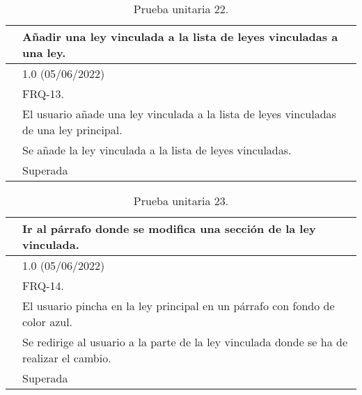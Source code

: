 \begin{table}[H]
\begin{center}
\begin{tabular}{|p{3cm}|p{10cm}|} \hline
\centering {\bf PU-22} & Añadir una ley vinculada a la lista de leyes vinculadas a una ley.  \\ \hline\hline
\centering {\bf Versión} & 1.0 (05/06/2022) \\ \hline
\centering {\bf Dependencias} & FRQ-13. \\ \hline
\centering {\bf Descripción} &  El usuario añade una ley vinculada a la lista de leyes vinculadas de una ley principal. \\ \hline
\centering {\bf Criterio de aceptación} & Se añade la ley vinculada a la lista de leyes vinculadas. \\ \hline
\centering {\bf Estado} & Superada \\ \hline
\end{tabular}
\caption{Prueba unitaria 22.}
\label{enlacePU22}
\end{center}
\end{table}

\begin{table}[H]
\begin{center}
\begin{tabular}{|p{3cm}|p{10cm}|} \hline
\centering {\bf PU-23} & Ir al párrafo donde se modifica una sección de la ley vinculada.  \\ \hline\hline
\centering {\bf Versión} & 1.0 (05/06/2022) \\ \hline
\centering {\bf Dependencias} & FRQ-14. \\ \hline
\centering {\bf Descripción} &  El usuario pincha en la ley principal en un párrafo con fondo de color azul. \\ \hline
\centering {\bf Criterio de aceptación} & Se redirige al usuario a la parte de la ley vinculada donde se ha de realizar el cambio. \\ \hline
\centering {\bf Estado} & Superada \\ \hline
\end{tabular}
\caption{Prueba unitaria 23.}
\label{enlacePU23}
\end{center}
\end{table}

